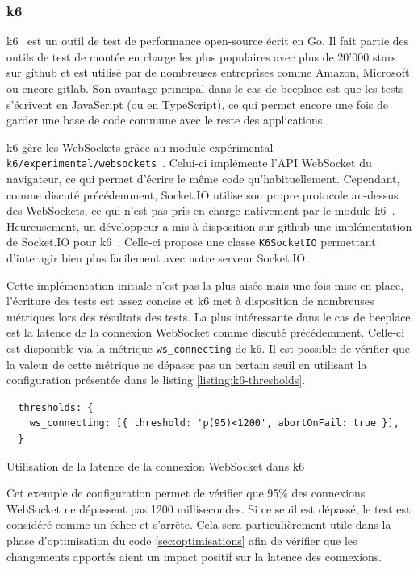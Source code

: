\subsubsection{k6}

k6~\cite{k6} est un outil de test de performance open-source écrit en Go. Il fait partie des outils de test de montée en charge les plus populaires avec plus de 20'000 stars sur \gls{github} et est utilisé par de nombreuses entreprises comme Amazon, Microsoft ou encore \gls{gitlab}. Son avantage principal dans le cas de \gls{beeplace} est que les tests s'écrivent en JavaScript (ou en TypeScript), ce qui permet encore une fois de garder une base de code commune avec le reste des applications.

k6 gère les WebSockets grâce au module expérimental \texttt{k6/experimental/websockets}~\cite{k6-websockets}. Celui-ci implémente l'API WebSocket du navigateur, ce qui permet d'écrire le même code qu'habituellement. Cependant, comme discuté précédemment, Socket.IO utilise son propre protocole au-dessus des WebSockets, ce qui n'est pas pris en charge nativement par le module k6~\cite{k6-socket-io-issue}. Heureusement, un développeur a mis à disposition sur \gls{github} une implémentation de Socket.IO pour k6~\cite{k6-socket-io}. Celle-ci propose une classe \texttt{K6SocketIO} permettant d'interagir bien plus facilement avec notre serveur Socket.IO.

Cette implémentation initiale n'est pas la plus aisée mais une fois mise en place, l'écriture des tests est assez concise et k6 met à disposition de nombreuses métriques lors des résultats des tests. La plus intéressante dans le cas de \gls{beeplace} est la latence de la connexion WebSocket comme discuté précédemment. Celle-ci est disponible via la métrique \texttt{ws\_connecting} de k6. Il est possible de vérifier que la valeur de cette métrique ne dépasse pas un certain seuil en utilisant la configuration présentée dans le listing \ref{listing:k6-thresholds}.

\begin{listing}[H]
  \begin{verbatim}
  thresholds: {
    ws_connecting: [{ threshold: 'p(95)<1200', abortOnFail: true }],
  }
\end{verbatim}
  \caption{Utilisation de la latence de la connexion WebSocket dans k6}
  \label{listing:k6-thresholds}
\end{listing}

Cet exemple de configuration permet de vérifier que 95\% des connexions WebSocket ne dépassent pas 1200 millisecondes. Si ce seuil est dépassé, le test est considéré comme un échec et s'arrête. Cela sera particulièrement utile dans la phase d'optimisation du code \ref{sec:optimisations} afin de vérifier que les changements apportés aient un impact positif sur la latence des connexions.

